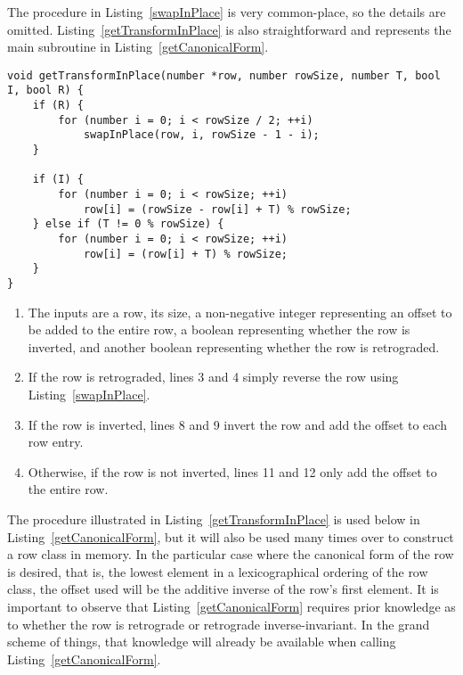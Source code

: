 The procedure in Listing~\ref{swapInPlace} is very common-place, so the details are omitted. Listing~\ref{getTransformInPlace} is also straightforward and represents the main subroutine in Listing~\ref{getCanonicalForm}.

\begin{lstlisting}[caption={Transforming a row in place.},label={getTransformInPlace}]
void getTransformInPlace(number *row, number rowSize, number T, bool I, bool R) {
    if (R) {
        for (number i = 0; i < rowSize / 2; ++i)
            swapInPlace(row, i, rowSize - 1 - i);
    }

    if (I) {
        for (number i = 0; i < rowSize; ++i)
            row[i] = (rowSize - row[i] + T) % rowSize;
    } else if (T != 0 % rowSize) {
        for (number i = 0; i < rowSize; ++i)
            row[i] = (row[i] + T) % rowSize;
    }
}
\end{lstlisting}

\begin{enumerate}
\item The inputs are a row, its size, a non-negative integer representing an offset to be added to the entire row, a boolean representing whether the row is inverted, and another boolean representing whether the row is retrograded.
\addtocounter{enumi}{1}
\item If the row is retrograded, lines 3 and 4 simply reverse the row using Listing~\ref{swapInPlace}.
\addtocounter{enumi}{4}
\item If the row is inverted, lines 8 and 9 invert the row and add the offset to each row entry.
\addtocounter{enumi}{2}
\item Otherwise, if the row is not inverted, lines 11 and 12 only add the offset to the entire row.
\end{enumerate}

The procedure illustrated in Listing~\ref{getTransformInPlace} is used below in Listing~\ref{getCanonicalForm}, but it will also be used many times over to construct a row class in memory. In the particular case where the canonical form of the row is desired, that is, the lowest element in a lexicographical ordering of the row class, the offset used will be the additive inverse of the row's first element. It is important to observe that Listing~\ref{getCanonicalForm} requires prior knowledge as to whether the row is retrograde or retrograde inverse-invariant. In the grand scheme of things, that knowledge will already be available when calling Listing~\ref{getCanonicalForm}.

